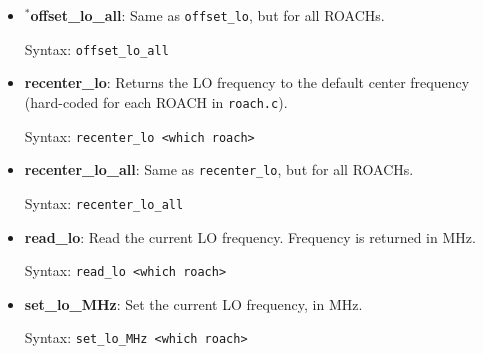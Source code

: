 \begin{itemize}[leftmargin=*,label={}]
\item $^{*}$\textbf{offset\_lo\_all}: Same as \texttt{offset\_lo}, but for all ROACHs.

Syntax: \texttt{offset\_lo\_all}

\item \textbf{recenter\_lo}: Returns the LO frequency to the default center frequency (hard-coded for each ROACH in \texttt{roach.c}).

Syntax: \texttt{recenter\_lo <which roach>}

\item \textbf{recenter\_lo\_all}: Same as \texttt{recenter\_lo}, but for all ROACHs.

Syntax: \texttt{recenter\_lo\_all}

\item \textbf{read\_lo}: Read the current LO frequency. Frequency is returned in MHz.

Syntax: \texttt{read\_lo <which roach>}

\item \textbf{set\_lo\_MHz}: Set the current LO frequency, in MHz.

Syntax: \texttt{set\_lo\_MHz <which roach>}

\end{itemize}

